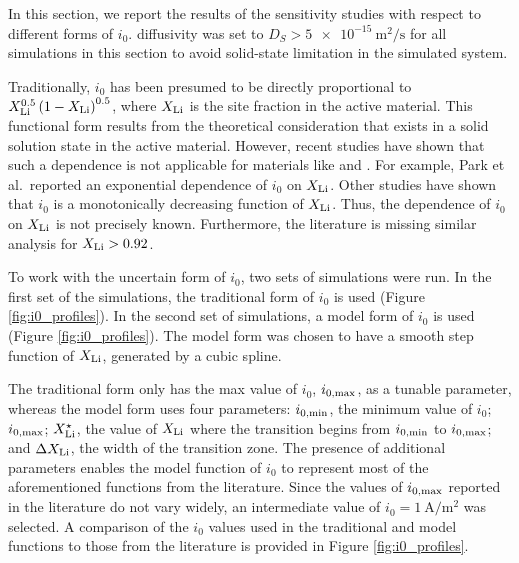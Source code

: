 \documentclass{article}
\begin{document}

In this section, we report the results of the sensitivity studies with
respect to different forms of $i_0$.  diffusivity was set to
$D_S>\SI{5e-15}{\meter\squared\per\second}$ for all simulations in
this section to avoid solid-state limitation in the simulated system.


Traditionally, $i_0$ has been presumed to be directly proportional to
$X_{\rm{Li}}^{0.5}\left(1-X_{\rm{Li}}\right)^{0.5}$, where
$X_{\rm{Li}}$ is the  site fraction in the active
material\cite{newman1994-2,newman1993,newman1996,newman1995-2}. This
functional form results from the theoretical consideration that
 exists in a solid solution state in the active
material. However, recent studies have shown that such a dependence is
not applicable for materials like \nca{}\cite{chueh2021} and
\nmc{}\cite{mukherjee2017,chiang2020,tsai2018}. For example, Park et
al.\cite{chueh2021}\ reported an exponential dependence of $i_0$ on
$X_{\rm{Li}}$\cite{chueh2021}. Other studies have shown that $i_0$ is
a monotonically decreasing function of
$X_{\rm{Li}}$\cite{mukherjee2017,chiang2020,tsai2018}. Thus, the
dependence of $i_0$ on $X_{\rm{Li}}$ is not precisely
known. Furthermore, the literature is missing similar analysis for
$X_{\rm{Li}} > 0.92$.

To work with the uncertain form of $i_0$, two sets of simulations were
run. In the first set of the simulations, the traditional form of
$i_0$ is used (Figure \ref{fig:i0_profiles}). In the second set of
simulations, a model form of $i_0$ is used (Figure
\ref{fig:i0_profiles}). The model form was chosen to have a smooth
step function of $X_{\rm{Li}}$, generated by a cubic spline.

The traditional form only has the max value of $i_0$,
$i_{0,\rm{max}}$, as a tunable parameter, whereas the model form uses
four parameters: $i_{0,\rm{min}}$, the minimum value of $i_0$;
$i_{0,\rm{max}}$; $X_{\rm{Li}}^{\star}$, the value of $X_{\rm{Li}}$
where the transition begins from $i_{0,\rm{min}}$ to $i_{0,\rm{max}}$;
and $\Delta X_{\rm{Li}}$, the width of the transition zone. The
presence of additional parameters enables the model function of $i_0$
to represent most of the aforementioned functions from the
literature. Since the values of $i_{0,\rm{max}}$ reported in the
literature\cite{tsai2018,dees2008} do not vary widely, an intermediate
value of $i_0 = \SI{1}{\ampere\per\meter\squared}$ was selected. A
comparison of the $i_0$ values used in the traditional and model
functions to those from the literature is provided in Figure
\ref{fig:i0_profiles}.
\end{document}
